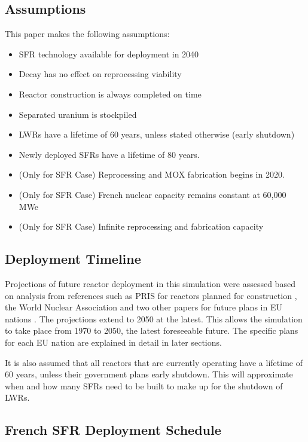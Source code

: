 \subsection{Assumptions}
This paper makes the following assumptions:
\begin{itemize}
        \item \gls{SFR} technology available for deployment in 2040
        \item Decay has no effect on reprocessing viability
        \item Reactor construction is always completed on time 
        \item Separated uranium is stockpiled
        \item \glspl{LWR} have a lifetime of 60 years, unless stated otherwise (early shutdown)
        \item Newly deployed \glspl{SFR} have a lifetime of 80 years.
        \item (Only for SFR Case) Reprocessing and \gls{MOX} fabrication begins in 2020.
        \item (Only for SFR Case) French nuclear capacity remains constant at 60,000 MWe
        \item (Only for SFR Case) Infinite reprocessing and fabrication capacity
\end{itemize}


\subsection{Deployment Timeline}
Projections of future reactor deployment in this simulation were
assessed based on analysis from references such as \gls{PRIS} for reactors planned for construction \cite{iaea_pris_nodate},
the World Nuclear Association and two other papers for future plans in EU nations
\cite{world_nuclear_association_nuclear_2017, joskow_future_2012, hatch_politics_2015}.
The projections extend to 2050 at the latest. This allows the simulation to take place from
1970 to 2050, the latest foreseeable future. The specific plans for each \gls{EU} nation are explained
in detail in later sections.

It is also assumed that all reactors that are 
currently operating have a lifetime of 60 years, unless their government plans
early shutdown. This will approximate when and how many \glspl{SFR} need to be built
to make up for the shutdown of \glspl{LWR}.

\subsection{French \gls{SFR} Deployment Schedule}

